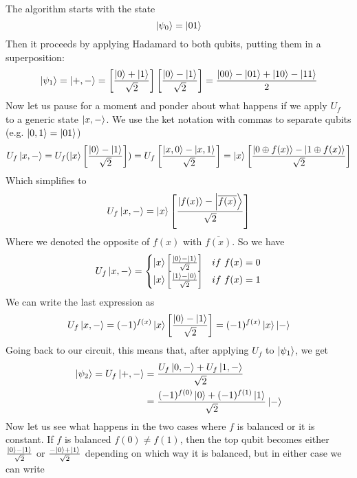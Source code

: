 \documentclass[12pt,a4paper]{report}
\theoremstyle{definition}
\theoremstyle{definition}
\theoremstyle{definition}
\begin{document}
The algorithm starts with the state
\begin{equation*}
    \ket{\psi_0} = \ket{01}
\end{equation*}
Then it proceeds by applying Hadamard to both qubits, putting them in a superposition:
\begin{equation*}
    \ket{\psi_1} = \ket{+,-} = \left[\frac{\ket{0}+\ket{1}}{\sqrt{2}}\right]\left[\frac{\ket{0}-\ket{1}}{\sqrt{2}}\right]=\frac{\ket{00}-\ket{01}+\ket{10}-\ket{11}}{2}
\end{equation*}
Now let us pause for a moment and ponder about what happens if we apply $U_f$ to a generic state $\ket{x, -}$. We use the ket notation with commas to separate qubits (e.g. $\ket{0, 1} = \ket{01}$)
\begin{equation*}
    U_f\ket{x,-}=U_f(\ket{x}\left[\frac{\ket{0}-\ket{1}}{\sqrt{2}}\right])=U_f\left[\frac{\ket{x,0}-\ket{x,1}}{\sqrt{2}}\right]=\ket{x}\left[\frac{\ket{0 \oplus f(x)}-\ket{1 \oplus f(x)}}{\sqrt{2}}\right]
\end{equation*}
Which simplifies to
\begin{equation*}
    U_f\ket{x,-}=\ket{x}\left[\frac{\ket{f(x)}-\ket{\overline{f(x)}}}{\sqrt{2}}\right]
\end{equation*}
Where we denoted the opposite of $f(x)$ with $\overline{f(x)}$. So we have
\begin{equation*}
    U_f\ket{x,-}=\begin{cases}
        \ket{x}\left[\frac{\ket{0}-\ket{1}}{\sqrt{2}}\right] & if\ f(x) = 0\\
        \ket{x}\left[\frac{\ket{1}-\ket{0}}{\sqrt{2}}\right] & if\ f(x) = 1\\
    \end{cases}
\end{equation*}
We can write the last expression as
\begin{equation*}
    U_f\ket{x,-}=(-1)^{f(x)}\ket{x}\left[\frac{\ket{0}-\ket{1}}{\sqrt{2}}\right]=(-1)^{f(x)}\ket{x}\ket{-}
\end{equation*}
Going back to our circuit, this means that, after applying $U_f$ to $\ket{\psi_1}$, we get
\begin{align*}
    \ket{\psi_2}=U_f\ket{+,-}&=\frac{U_f\ket{0,-}+U_f\ket{1,-}}{\sqrt{2}}\\
    &=\frac{(-1)^{f(0)}\ket{0}+(-1)^{f(1)}\ket{1}}{\sqrt{2}}\ket{-}
\end{align*}
Now let us see what happens in the two cases where $f$ is balanced or it is constant.
If $f$ is balanced $f(0)\neq f(1)$, then the top qubit becomes either $\frac{\ket{0}-\ket{1}}{\sqrt{2}}$ or $\frac{-\ket{0}+\ket{1}}{\sqrt{2}}$ depending on which way it is balanced, but in either case we can write
\end{document}
